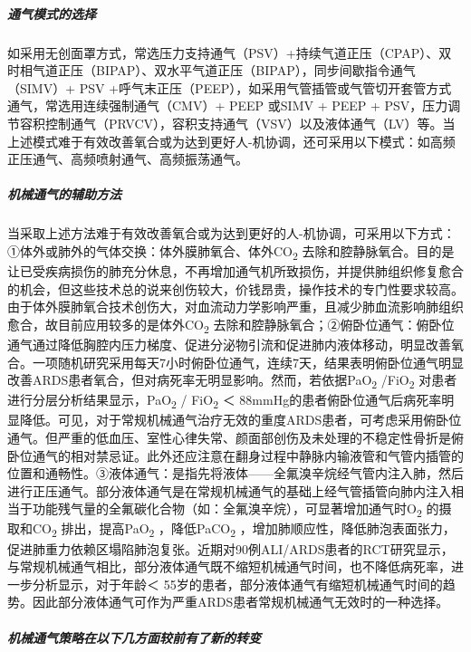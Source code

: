 \subparagraph{通气模式的选择}

如采用无创面罩方式，常选压力支持通气（PSV）+持续气道正压（CPAP）、双时相气道正压（BIPAP）、双水平气道正压（BIPAP），同步间歇指令通气（SIMV）+
PSV
+呼气末正压（PEEP），如采用气管插管或气管切开套管方式通气，常选用连续强制通气（CMV）+
PEEP 或SIMV + PEEP +
PSV，压力调节容积控制通气（PRVCV），容积支持通气（VSV）以及液体通气（LV）等。当上述模式难于有效改善氧合或为达到更好人-机协调，还可采用以下模式：如高频正压通气、高频喷射通气、高频振荡通气。

\subparagraph{机械通气的辅助方法}

当采取上述方法难于有效改善氧合或为达到更好的人-机协调，可采用以下方式：①体外或肺外的气体交换：体外膜肺氧合、体外CO\textsubscript{2}
去除和腔静脉氧合。目的是让已受疾病损伤的肺充分休息，不再增加通气机所致损伤，并提供肺组织修复愈合的机会，但这些技术总的说来创伤较大，价钱昂贵，操作技术的专门性要求较高。由于体外膜肺氧合技术创伤大，对血流动力学影响严重，且减少肺血流影响肺组织愈合，故目前应用较多的是体外CO\textsubscript{2}
去除和腔静脉氧合；②俯卧位通气：俯卧位通气通过降低胸腔内压力梯度、促进分泌物引流和促进肺内液体移动，明显改善氧合。一项随机研究采用每天7小时俯卧位通气，连续7天，结果表明俯卧位通气明显改善ARDS患者氧合，但对病死率无明显影响。然而，若依据PaO\textsubscript{2}
/FiO\textsubscript{2} 对患者进行分层分析结果显示，PaO\textsubscript{2} /
FiO\textsubscript{2} ＜
88mmHg的患者俯卧位通气后病死率明显降低。可见，对于常规机械通气治疗无效的重度ARDS患者，可考虑采用俯卧位通气。但严重的低血压、室性心律失常、颜面部创伤及未处理的不稳定性骨折是俯卧位通气的相对禁忌证。此外还应注意在翻身过程中静脉内输液管和气管内插管的位置和通畅性。③液体通气：是指先将液体------全氟溴辛烷经气管内注入肺，然后进行正压通气。部分液体通气是在常规机械通气的基础上经气管插管向肺内注入相当于功能残气量的全氟碳化合物（如：全氟溴辛烷），可显著增加通气时O\textsubscript{2}
的摄取和CO\textsubscript{2} 排出，提高PaO\textsubscript{2}
，降低PaCO\textsubscript{2}
，增加肺顺应性，降低肺泡表面张力，促进肺重力依赖区塌陷肺泡复张。近期对90例ALI/ARDS患者的RCT研究显示，与常规机械通气相比，部分液体通气既不缩短机械通气时间，也不降低病死率，进一步分析显示，对于年龄＜
55岁的患者，部分液体通气有缩短机械通气时间的趋势。因此部分液体通气可作为严重ARDS患者常规机械通气无效时的一种选择。

\subparagraph{机械通气策略在以下几方面较前有了新的转变}

